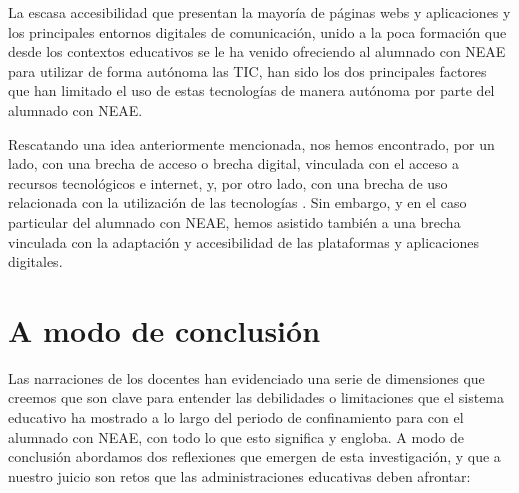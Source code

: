 \documentclass[spanish]{textolivre}
\begin{document}
La escasa accesibilidad que presentan la mayoría de páginas webs y aplicaciones \cite{renilla2010} %
y los principales entornos digitales de comunicación, unido a la poca formación que desde los contextos educativos se le ha venido ofreciendo al alumnado con NEAE para utilizar de forma autónoma las TIC, han sido los dos principales factores que han limitado el uso de estas tecnologías de manera autónoma por parte del alumnado con NEAE.

Rescatando una idea anteriormente mencionada, nos hemos encontrado, por un lado, con una brecha de acceso o brecha digital, vinculada con el acceso a recursos tecnológicos e internet, y, por otro lado, con una brecha de uso relacionada con la utilización de las tecnologías \cite{rogero2020}. %
Sin embargo, y en el caso particular del alumnado con NEAE, hemos asistido también a una brecha vinculada con la adaptación y accesibilidad de las plataformas y aplicaciones digitales. 

\section{A modo de conclusión}
Las narraciones de los docentes han evidenciado una serie de dimensiones que creemos que son clave para entender las debilidades o limitaciones que el sistema educativo ha mostrado a lo largo del periodo de confinamiento para con el alumnado con NEAE, con todo lo que esto significa y engloba. A modo de conclusión abordamos dos reflexiones que emergen de esta investigación, y que a nuestro juicio son retos que las administraciones educativas deben afrontar:
\end{document}
